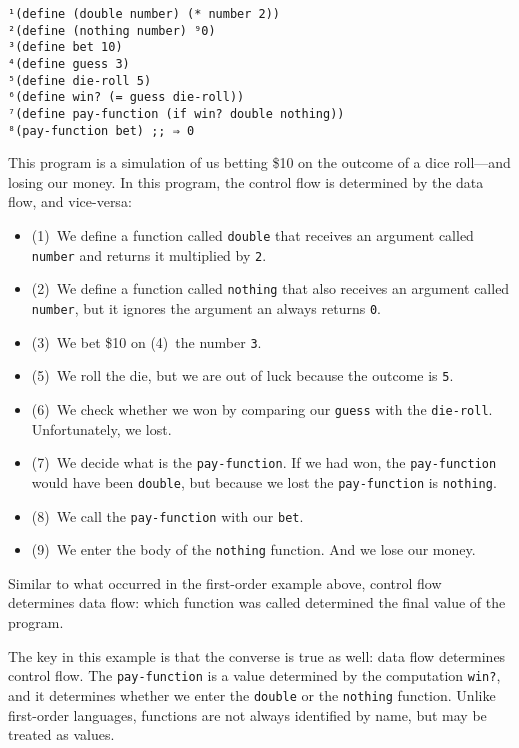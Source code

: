 \documentclass[12pt, oneside]{book}
\begin{document}
\begin{Verbatim}
¹(define (double number) (* number 2))
²(define (nothing number) ⁹0)
³(define bet 10)
⁴(define guess 3)
⁵(define die-roll 5)
⁶(define win? (= guess die-roll))
⁷(define pay-function (if win? double nothing))
⁸(pay-function bet) ;; ⇒ 0
\end{Verbatim}

This program is a simulation of us betting \$10 on the outcome of a dice roll—and losing our money. In this program, the control flow is determined by the data flow, and vice-versa:

\begin{itemize}
  \item (1)~We define a function called \texttt{double} that receives an argument called \texttt{number} and returns it multiplied by \texttt{2}.
  \item (2)~We define a function called \texttt{nothing} that also receives an argument called \texttt{number}, but it ignores the argument an always returns \texttt{0}.
  \item (3)~We bet \$10 on (4)~the number \texttt{3}.
  \item (5)~We roll the die, but we are out of luck because the outcome is \texttt{5}.
  \item (6)~We check whether we won by comparing our \texttt{guess} with the \texttt{die-roll}. Unfortunately, we lost.
  \item (7)~We decide what is the \texttt{pay-function}. If we had won, the \texttt{pay-function} would have been \texttt{double}, but because we lost the \texttt{pay-function} is \texttt{nothing}.
  \item (8)~We call the \texttt{pay-function} with our \texttt{bet}.
  \item (9)~We enter the body of the \texttt{nothing} function. And we lose our money.
\end{itemize}

Similar to what occurred in the first-order example above, control flow determines data flow: which function was called determined the final value of the program.

The key in this example is that the converse is true as well: data flow determines control flow. The \texttt{pay-function} is a value determined by the computation \texttt{win?}, and it determines whether we enter the \texttt{double} or the \texttt{nothing} function. Unlike first-order languages, functions are not always identified by name, but may be treated as values.
\end{document}
